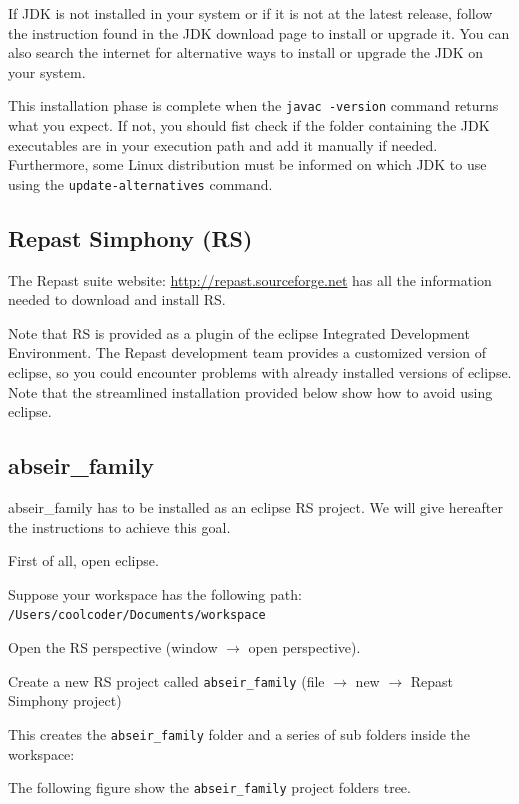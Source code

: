 \documentclass{article}
\begin{document}
If JDK is not installed in your system or if it is not at the latest release, follow the instruction found in the JDK download page to install or upgrade it. You can also search the internet for alternative ways to install or upgrade the JDK on your system.

This installation phase is complete when the \verb+javac -version+ command returns what you expect.
If not, you should fist check if the folder containing the JDK executables are in your execution path and add it manually if needed.
Furthermore, some Linux distribution must be informed on which JDK to use using the \verb+update-alternatives+ command. 

\subsection{Repast Simphony (RS)}

The Repast suite website: \url{http://repast.sourceforge.net} has all the information needed to download and install RS.

Note that RS is provided as a plugin of the eclipse Integrated Development Environment. The Repast development team provides a customized version of eclipse, so you could encounter problems with already installed versions of eclipse. Note that the streamlined installation provided below show how to avoid using eclipse.

\subsection{abseir\_family}

abseir\_family has to be installed as an eclipse RS project. We will give hereafter the instructions to achieve this goal.

First of all, open eclipse.

Suppose your workspace has the following path:\\
\verb+/Users/coolcoder/Documents/workspace+

Open the RS perspective (window $\rightarrow$ open perspective).

Create a new RS project called \verb+abseir_family+ (file $\rightarrow$ new $\rightarrow$ Repast Simphony project)

This creates the \verb+abseir_family+ folder and a series of sub folders inside the workspace:

The following figure show the \verb+abseir_family+ project folders tree.
\end{document}
